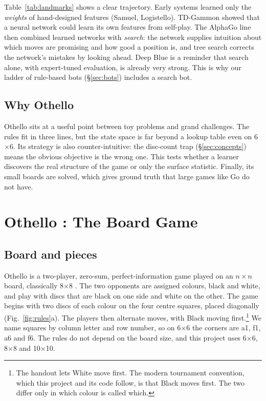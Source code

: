 \documentclass[11pt]{article}
\newcommand{\bx}[1]{#1$\times$#1}
\begin{document}
Table~\ref{tab:landmarks} shows a clear trajectory. Early systems learned only
the \emph{weights} of hand-designed features (Samuel, Logistello). TD-Gammon
showed that a neural network could learn its own features from self-play. The
AlphaGo line then combined learned networks with \emph{search}: the network
supplies intuition about which moves are promising and how good a position is,
and tree search corrects the network's mistakes by looking ahead. Deep Blue is a
reminder that search alone, with expert-tuned evaluation, is already very strong.
This is why our ladder of rule-based bots (\S\ref{sec:bots}) includes a search
bot.

\subsection{Why Othello}
Othello sits at a useful point between toy problems and grand challenges. The
rules fit in three lines, but the state space is far beyond a lookup table even
on \bx{6}. Its strategy is also counter-intuitive: the disc-count trap
(\S\ref{sec:concepts}) means the obvious objective is the wrong one. This tests
whether a learner discovers the real structure of the game or only the surface
statistic. Finally, its small boards are solved, which gives ground truth that
large games like Go do not have.


\section{Othello : The Board Game}
\label{sec:game}

\subsection{Board and pieces}
Othello is a two-player, zero-sum, perfect-information game played on an
$n\times n$ board, classically \bx{8} \cite{cs121}. The two opponents are
assigned colours, black and white, and play with discs that are black on one
side and white on the other. The game begins with two discs of each colour on
the four centre squares, placed diagonally (Fig.~\ref{fig:rules}a). The players
then alternate moves, with Black moving first.\footnote{The handout
\cite{cs121} lets White move first. The modern tournament convention, which this
project and its code follow, is that Black moves first. The two differ only in
which colour is called which.} We name squares by column letter and row
number, so on \bx{6} the corners are a1, f1, a6 and f6. The rules do not depend
on the board size, and this project uses \bx{6}, \bx{8} and \bx{10}.
\end{document}
